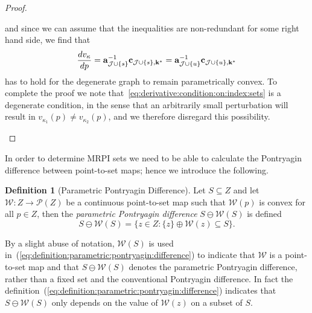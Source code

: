 \documentclass[journal]{IEEEtran}
\newcommand{\todo}[2]{%
  \providetoggle{#1}%
    \iftoggle{#1}{%
    {\color{red}#2}%
    }{#2}
}
\newcounter{thmcount}
\theoremstyle{remark}
\newtheorem{rem}[thmcount]{Remark}
\theoremstyle{definition}
\newtheorem{defi}[thmcount]{Definition}
\begin{document}
\begin{proof}
\begin{enumerate}
%
and since we can assume that the inequalities are non-redundant for some right hand side, we find that 
%
\begin{equation}\label{eq:derivative:condition:on:index:sets}
  \frac{dv_\kappa}{dp} = {\bf{a}}_{\mathcal J\cup \{s\}}^{-1}{\bf{c}}_{\mathcal J\cup \{s\},{\bf{k}}^\ast} = 
  {\bf{a}}_{\mathcal J\cup \{u\}}^{-1}{\bf{c}}_{\mathcal J\cup \{u\},{\bf{k}}^\ast}
\end{equation}
%
has to hold for the degenerate graph to remain parametrically convex.
%
To complete the proof we note that~\eqref{eq:derivative:condition:on:index:sets} is a degenerate condition, in the sense that an arbitrarily small perturbation will result in $v_{\kappa_1}(p) \neq v_{\kappa_2}(p)$, and we therefore disregard this possibility.
\end{enumerate}
\baselineskip
\end{proof}
%
%
In order to determine MRPI sets we need to be able to calculate the Pontryagin difference between point-to-set maps; hence we introduce the following.
%
\begin{defi}[Parametric Pontryagin Difference]\label{def:parametric:pontryagin:difference}
  Let $S\subseteq Z$ and let $\mathcal W:Z\to\mathscr P(Z)$ be a continuous point-to-set map such that
  $\mathcal W(p)$ is convex for all $p\in Z$, then the \emph{parametric Pontryagin difference} 
  $S\ominus \mathcal W(S)$ is defined
%
\begin{equation}\label{eq:definition:parametric:pontryagin:difference}
    S\ominus \mathcal W(S) = \bigl\{z\in Z: \{z\} \oplus \mathcal W(z)\subseteq S\bigr\}.
  \end{equation}
%
\end{defi}
%
By a slight abuse of notation, $\mathcal{W}(S)$ is used in~(\ref{eq:definition:parametric:pontryagin:difference}) to indicate that $\mathcal{W}$ is a point-to-set map and that $S\ominus\mathcal{W}(S)$ denotes the parametric Pontryagin difference, rather than a fixed set and the conventional Pontryagin difference. In fact the definition~(\ref{eq:definition:parametric:pontryagin:difference}) indicates that $S\ominus \mathcal{W}(S)$ only depends on the value of $\mathcal{W}(z)$ on a subset of $S$. 
%
\end{document}
